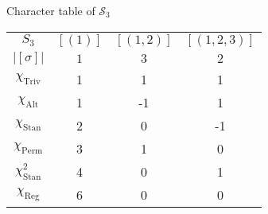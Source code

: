 \documentclass[10pt]{beamer}
\newcommand{\Sym}{\mathcal{S}}
\newcommand{\Reg}{\text{Reg}}
\newcommand{\Triv}{\text{Triv}}
\newcommand{\Alt}{\text{Alt}}
\newcommand{\Perm}{\text{Perm}}
\newcommand{\Stan}{\text{Stan}}
\begin{document}
	\begin{frame}{Character table of $\Sym_3$}
		\begin{example}[$\Sym_3$]
			\begin{table}[hbt!]
			\centering
			
			\begin{tabular}{c | c c c}
				$S_3$         & $[(1)]$   & $[(1,2)]$  & $[(1,2,3)]$ \\
				$|[\sigma]|$    & $ 1$ & $ 3$ & $ 2$ \\ \hline
				$\chi_\Triv$       & 1       & 1       & 1       \\
				$\chi_\Alt$       & 1       & -1      & 1       \\
				$\chi_\Stan$       & 2       & 0       & -1      \\ \hline\hline
				$\chi_\Perm$       & 3       & 1       & 0       \\
				$\chi_\Stan^2$ & 4       & 0       & 1       \\
				$\chi_\Reg$       & 6       & 0       & 0       		\end{tabular}
			
		\end{table}
		\end{example}
	\end{frame}
	
\end{document}
